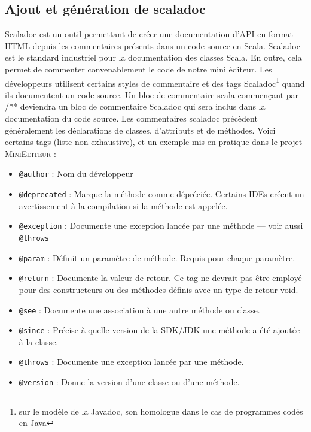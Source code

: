 \documentclass[a4paper,11pt]{article}
\begin{document}
\subsection{Ajout et génération de scaladoc}
Scaladoc est un outil permettant de créer une documentation d'API en format HTML depuis les commentaires présents dans un code source en Scala. Scaladoc est le standard industriel pour la documentation des classes Scala. En outre, cela permet de commenter convenablement le code de notre mini éditeur. Les développeurs utilisent certains styles de commentaire et des tags Scaladoc\footnote{sur le modèle de la Javadoc, son homologue dans le cas de programmes codés en Java} quand ils documentent un code source. Un bloc de commentaire scala commençant par /** deviendra un bloc de commentaire Scaladoc qui sera inclus dans la documentation du code source. Les commentaires scaladoc précèdent généralement les déclarations de classes, d'attributs et de méthodes. Voici certains tags (liste non exhaustive), et un exemple mis en pratique dans le projet \textsc{MiniEditeur} :
	\begin{itemize}
		\item \texttt{@author} : Nom du développeur
		\item \texttt{@deprecated} : Marque la méthode comme dépréciée. Certains IDEs créent un avertissement à la compilation si la méthode est appelée.
		\item \texttt{@exception} : Documente une exception lancée par une méthode — voir aussi \texttt{@throws}
		\item \texttt{@param} : Définit un paramètre de méthode. Requis pour chaque paramètre.
		\item \texttt{@return} : Documente la valeur de retour. Ce tag ne devrait pas être employé pour des constructeurs ou des méthodes définis avec un type de retour void.
		\item \texttt{@see} : Documente une association à une autre méthode ou classe.
		\item \texttt{@since} : Précise à quelle version de la SDK/JDK une méthode a été ajoutée à la classe.
		\item \texttt{@throws} : Documente une exception lancée par une méthode.
		\item \texttt{@version} : Donne la version d'une classe ou d'une méthode.
	\end{itemize}
\end{document}
